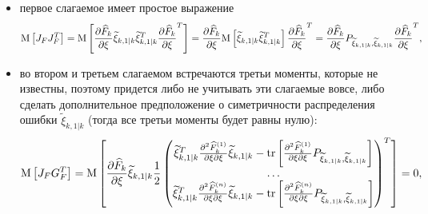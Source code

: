 \begin{itemize}
    \item первое слагаемое имеет простое выражение
        $$
            \mathrm{M} \left [ J_F J_F^T \right ]
                = \mathrm{M} \left [  \frac{\partial \widehat{F}_k}{\partial \xi} \widetilde{\xi}_{k,1|k} \widetilde{\xi}_{k,1|k}^T \frac{\partial \widehat{F}_k}{\partial \xi}^T  \right ]
                = \frac{\partial \widehat{F}_k}{\partial \xi} \mathrm{M} \left [ \widetilde{\xi}_{k,1|k} \widetilde{\xi}_{k,1|k}^T \right ] \frac{\partial \widehat{F}_k}{\partial \xi}^T
                = \frac{\partial \widehat{F}_k}{\partial \xi} P_{\widetilde{\xi}_{k,1|k}, \widetilde{\xi}_{k,1|k}} \frac{\partial \widehat{F}_k}{\partial \xi}^T
            ,
        $$

    \item во втором и третьем слагаемом встречаются третьи моменты, которые не известны, поэтому придется либо не учитывать эти слагаемые вовсе, либо
        сделать дополнительное предположение о симетричности распределения ошибки $\widetilde{\xi}_{k,1|k}$ (тогда все третьи моменты будет равны нулю):
        $$
            \mathrm{M} \left [ J_F G_F^T \right ]
            = \mathrm{M} \left [ 
                \frac{\partial \widehat{F}_k}{\partial \xi} \widetilde{\xi}_{k,1|k}
                \frac{1}{2}
                    \begin{pmatrix}
                        \widetilde{\xi}_{k,1|k}^T \frac{\partial^2 \widehat{F}_k^{(1)}}{{\partial \xi}{\partial \xi}} \widetilde{\xi}_{k,1|k} - \mathrm{tr} \left [ \frac{\partial^2 \widehat{F}_k^{(1)}}{{\partial \xi}{\partial \xi}} P_{\widetilde{\xi}_{k,1|k}, \widetilde{\xi}_{k,1|k}} \right ] \\
                        \dots \\
                        \widetilde{\xi}_{k,1|k}^T \frac{\partial^2 \widehat{F}_k^{(n)}}{{\partial \xi}{\partial \xi}} \widetilde{\xi}_{k,1|k} - \mathrm{tr} \left [ \frac{\partial^2 \widehat{F}_k^{(n)}}{{\partial \xi}{\partial \xi}} P_{\widetilde{\xi}_{k,1|k}, \widetilde{\xi}_{k,1|k}} \right ]
                    \end{pmatrix}^T
             \right ]
            = 0 ,
        $$


\end{itemize}
